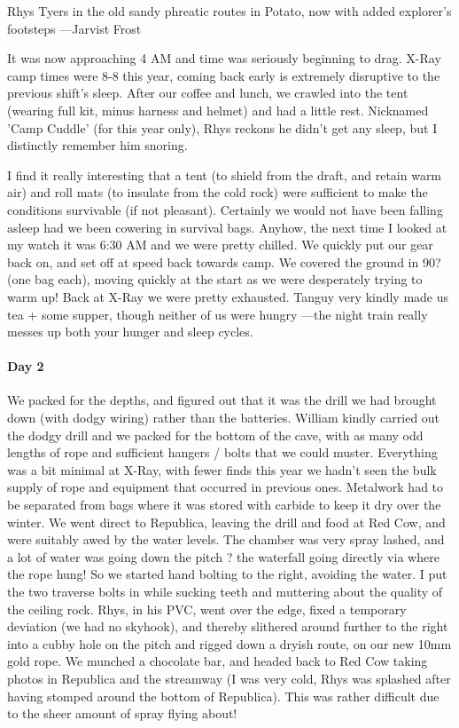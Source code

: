 \begin{marginfigure}
\checkoddpage \ifoddpage \forcerectofloat \else \forceversofloat \fi
\centering
 \caption{Rhys Tyers in the old sandy phreatic routes in Potato, now with added explorer's footsteps ---Jarvist Frost}
 \label{potato formations}
\end{marginfigure}

It was now approaching 4 AM and time was seriously beginning to drag. X-Ray camp times were 8-8 this year, coming back early is extremely disruptive to the previous shift's sleep. After our coffee and lunch, we crawled into the tent (wearing full kit, minus harness and helmet) and had a little rest. Nicknamed 'Camp Cuddle' (for this year only), Rhys reckons he didn't get any sleep, but I distinctly remember him snoring.

I find it really interesting that a tent (to shield from the draft, and retain warm air) and roll mats (to insulate from the cold rock) were sufficient to make the conditions survivable (if not pleasant). Certainly we would not have been falling asleep had we been cowering in survival bags.
Anyhow, the next time I looked at my watch it was 6:30 AM and we were pretty chilled. We quickly put our gear back on, and set off at speed back towards camp. We covered the ground in 90? (one bag each), moving quickly at the start as we were desperately trying to warm up!
Back at X-Ray we were pretty exhausted. Tanguy very kindly made us tea + some supper, though neither of us were hungry ---the night train really messes up both your hunger and sleep cycles.

\paragraph{Day 2}
We packed for the depths, and figured out that it was the drill we had brought down (with dodgy wiring) rather than the batteries. William kindly carried out the dodgy drill and we packed for the bottom of the cave, with as many odd lengths of rope and sufficient hangers / bolts that we could muster. Everything was a bit minimal at X-Ray, with fewer finds this year we hadn't seen the bulk supply of rope and equipment that occurred in previous ones. Metalwork had to be separated from bags where it was stored with carbide to keep it dry over the winter.
We went direct to Republica, leaving the drill and food at Red Cow, and were suitably awed by the water levels. The chamber was very spray lashed, and a lot of water was going down the pitch ? the waterfall going directly via where the rope hung!
So we started hand bolting to the right, avoiding the water. I put the two traverse bolts in while sucking teeth and muttering about the quality of the ceiling rock. Rhys, in his PVC, went over the edge, fixed a temporary deviation (we had no skyhook), and thereby slithered around further to the right into a cubby hole on the pitch and rigged down a dryish route, on our new 10mm gold rope. We munched a chocolate bar, and headed back to Red Cow taking photos in Republica and the streamway (I was very cold, Rhys was splashed after having stomped around the bottom of Republica). This was rather difficult due to the sheer amount of spray flying about!

